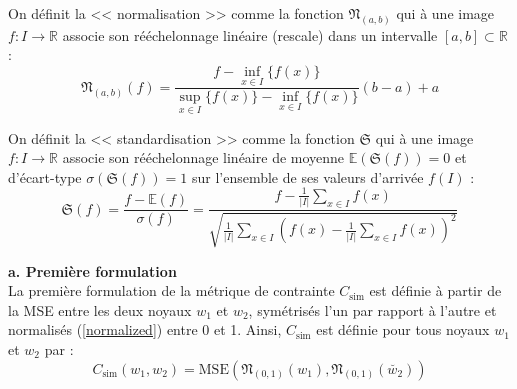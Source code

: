 \vspace{0.0mm}
On définit la << normalisation >> comme la fonction $\mathfrak{N}_{(a,b)}$ qui à une image $f: I \rightarrow \mathbb{R}$ associe son rééchelonnage linéaire (rescale) dans un intervalle $[a,b] \subset \mathbb{R}$ : \\

\vspace{-3.5mm}
\begin{equation}
    \mathfrak{N}_{(a,b)} (f) = \frac{f-\inf_{x \in I}\{f(x)\}}{\sup_{x \in I}\{f(x)\}-\inf_{x \in I}\{f(x)\}} \left ( b-a \right ) + a
    \label{normalized}
\end{equation}

\vspace{4.5mm}
On définit la << standardisation >> comme la fonction $\mathfrak{S}$ qui à une image $f: I \rightarrow \mathbb{R}$ associe son rééchelonnage linéaire de moyenne $\mathbb{E}(\mathfrak{S}(f)) = 0$ et d'écart-type $\sigma(\mathfrak{S}(f)) = 1$ sur l'ensemble de ses valeurs d'arrivée $f(I)$ : \\

\vspace{-4.0mm}
\begin{equation}
    \mathfrak{S} (f) = \frac{f-\mathbb{E}(f)}{\sigma(f)} = \frac{ f - \frac{1}{|I|} \sum_{x \in I} f(x) }{ \sqrt{ \frac{1}{|I|} \sum_{x \in I} \left ( f(x) - \frac{1}{|I|} \sum_{x \in I} f(x) \right ) ^2 } }
    \label{standardized}
\end{equation}


\newpage

\noindent \textbf{a. Première formulation} \\

\vspace{-1.5mm}
La première formulation de la métrique de contrainte $C_\text{sim}$ est définie à partir de la MSE entre les deux noyaux $w_1$ et $w_2$, symétrisés l'un par rapport à l'autre et normalisés (\ref{normalized}) entre 0 et 1. Ainsi, $C_\text{sim}$ est définie pour tous noyaux $w_1$ et $w_2$ par : \\

\vspace{-4.7mm}
\begin{equation}
    C_\text{sim}(w_1,w_2) = \text{MSE} \left ( \mathfrak{N}_{(0,1)}(w_1) , \mathfrak{N}_{(0,1)}(\breve{w_2}) \right )
    \label{Csim1}
\end{equation}

